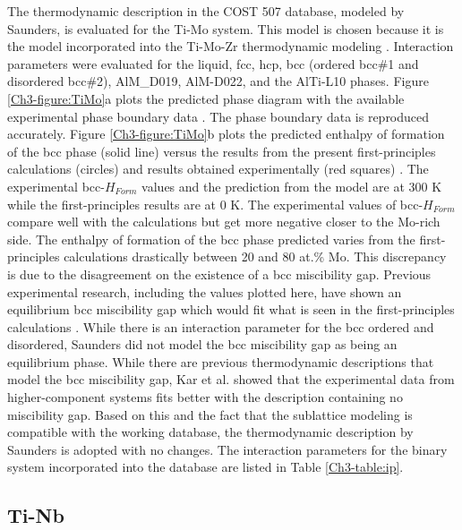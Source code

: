 The thermodynamic description in the COST 507 database, modeled by Saunders, \cite{Ansara1998} is evaluated for the Ti-Mo system. This model is chosen because it is the model incorporated into the Ti-Mo-Zr thermodynamic modeling \cite{Kar2008}. Interaction parameters were evaluated for the liquid, fcc, hcp, bcc (ordered bcc\#1 and disordered bcc\#2), AlM\_D019, AlM-D022, and the AlTi-L10 phases. Figure \ref{Ch3-figure:TiMo}a plots the predicted phase diagram \cite{Ansara1998} with the available experimental phase boundary data \cite{Murray1981}. The phase boundary data is reproduced accurately. Figure \ref{Ch3-figure:TiMo}b plots the predicted enthalpy of formation of the bcc phase (solid line) versus the results from the present first-principles calculations (circles) and results obtained experimentally (red squares) \cite{Uesugi2013}. The experimental bcc-$H_{Form}$ values and the prediction from the model are at 300 K while the first-principles results are at 0 K. The experimental values of bcc-$H_{Form}$ compare well with the calculations but get more negative closer to the Mo-rich side. The enthalpy of formation of the bcc phase predicted varies from the first-principles calculations drastically between 20 and 80 at.\% Mo. This discrepancy is due to the disagreement on the existence of a bcc miscibility gap. Previous experimental research, including the values plotted here, have shown an equilibrium bcc miscibility gap which would fit what is seen in the first-principles calculations \cite{Uesugi2013,Predel1997,Hoffman1967}. While there is an interaction parameter for the bcc ordered and disordered, Saunders \cite{Ansara1998} did not model the bcc miscibility gap as being an equilibrium phase. While there are previous thermodynamic descriptions that model the bcc miscibility gap, Kar et al. \cite{Kar2008} showed that the experimental data from higher-component systems fits better with the description containing no miscibility gap. Based on this and the fact that the sublattice modeling is compatible with the working database, the thermodynamic description by Saunders \cite{Ansara1998} is adopted with no changes. The interaction parameters for the binary system incorporated into the database are listed in Table \ref{Ch3-table:ip}.


\subsection{Ti-Nb}

